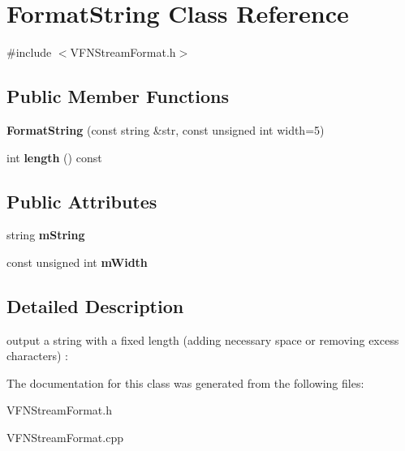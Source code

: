 \hypertarget{class_format_string}{}\section{Format\+String Class Reference}
\label{class_format_string}


{\ttfamily \#include $<$V\+F\+N\+Stream\+Format.\+h$>$}

\subsection*{Public Member Functions}
\begin{DoxyCompactItemize}
\item 
\mbox{\label{class_format_string_a89e88ecbdd91c8120ffbfbdc733c9b7b}} 
{\bfseries Format\+String} (const string \&str, const unsigned int width=5)
\item 
\mbox{\label{class_format_string_a2f2d86cd39480d24e9ba6db9dc54f416}} 
int {\bfseries length} () const
\end{DoxyCompactItemize}
\subsection*{Public Attributes}
\begin{DoxyCompactItemize}
\item 
\mbox{\label{class_format_string_a08c22a7bd34d0bcf7c62147cff2a5e85}} 
string {\bfseries m\+String}
\item 
\mbox{\label{class_format_string_ae1191d6d25031c2d6e142ce989ff6c74}} 
const unsigned int {\bfseries m\+Width}
\end{DoxyCompactItemize}


\subsection{Detailed Description}
output a string with a fixed length (adding necessary space or removing excess characters) \+:


\begin{DoxyCode}{0}
\end{DoxyCode}
 

The documentation for this class was generated from the following files\+:\begin{DoxyCompactItemize}
\item 
V\+F\+N\+Stream\+Format.\+h\item 
V\+F\+N\+Stream\+Format.\+cpp\end{DoxyCompactItemize}
